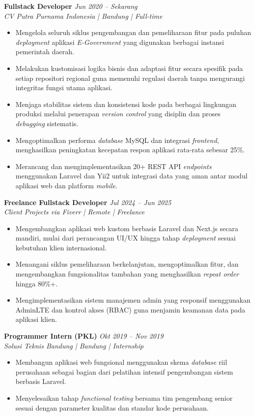 \documentclass[11pt,a4paper]{article}
\begin{document}
\textbf{Fullstack Developer} \hfill \textit{Jun 2020 -- Sekarang} \\
\textit{CV Putra Purnama Indonesia | Bandung | Full-time}
\begin{itemize}
    \item Mengelola seluruh siklus pengembangan dan pemeliharaan fitur pada puluhan \textit{deployment} aplikasi \textit{E-Government} yang digunakan berbagai instansi pemerintah daerah.
    \item Melakukan kustomisasi logika bisnis dan adaptasi fitur secara spesifik pada setiap repositori regional guna memenuhi regulasi daerah tanpa mengurangi integritas fungsi utama aplikasi.
    \item Menjaga stabilitas sistem dan konsistensi kode pada berbagai lingkungan produksi melalui penerapan \textit{version control} yang disiplin dan proses \textit{debugging} sistematis.
    \item Mengoptimalkan performa \textit{database} MySQL dan integrasi \textit{frontend}, menghasilkan peningkatan kecepatan respon aplikasi rata-rata sebesar 25\%.
    \item Merancang dan mengimplementasikan 20+ REST API \textit{endpoints} menggunakan Laravel dan Yii2 untuk integrasi data yang aman antar modul aplikasi web dan platform \textit{mobile}.
\end{itemize}

\textbf{Freelance Fullstack Developer} \hfill \textit{Jul 2024 -- Jun 2025} \\
\textit{Client Projects via Fiverr | Remote | Freelance}
\begin{itemize}
    \item Mengembangkan aplikasi web kustom berbasis Laravel dan Next.js secara mandiri, mulai dari perancangan UI/UX hingga tahap \textit{deployment} sesuai kebutuhan klien internasional.
    \item Menangani siklus pemeliharaan berkelanjutan, mengoptimalkan fitur, dan mengembangkan fungsionalitas tambahan yang menghasilkan \textit{repeat order} hingga 80\%+.
    \item Mengimplementasikan sistem manajemen admin yang responsif menggunakan AdminLTE dan kontrol akses (RBAC) guna menjamin keamanan data pada aplikasi klien.
\end{itemize}

\textbf{Programmer Intern (PKL)} \hfill \textit{Okt 2019 -- Nov 2019} \\
\textit{Solusi Teknis Bandung | Bandung | Internship}
\begin{itemize}
    \item Membangun aplikasi web fungsional menggunakan skema \textit{database} riil perusahaan sebagai bagian dari pelatihan intensif pengembangan sistem berbasis Laravel.
    \item Menyelesaikan tahap \textit{functional testing} bersama tim pengembang senior sesuai dengan parameter kualitas dan standar kode perusahaan.
\end{itemize}
\end{document}

